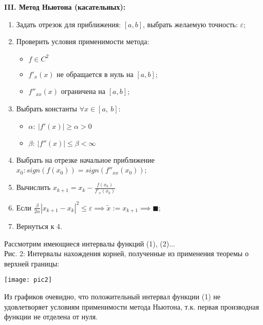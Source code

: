 {\large\bf{III. Метод  Ньютона (касательных):}}
\begin{enumerate}
    \item Задать отрезок для приближения: $[a, b]$, выбрать желаемую точность: $\varepsilon$;
    \item Проверить условия применимости метода:
        \begin{itemize}
            \item $f \in C^2$
            \item $f'_x(x)$ не обращается в нуль на $[a, b]$;
            \item $f''_{xx}(x)$ ограничена на $[a, b]$;
        \end{itemize}
    \item Выбрать константы $\forall x \in [a,~ b]$:
        \begin{itemize}
            \item $\alpha: ~ |f'(x)|\ge\alpha>0$
            \item $\beta: ~ |f''(x)|\le\beta<\infty$
        \end{itemize}
    \item Выбрать на отрезке начальное приближение $x_0: sign(f(x_0))=sign(f''_{xx}(x_0))$;
    \item Вычислить $x_{k+1}=x_k-\frac{f(x_k)}{f'_x(x_k)}$
    \item Если $\frac{\beta}{2\alpha}|x_{k+1}-x_k|^2\le\varepsilon
    \implies \widetilde{x}:=x_{k+1}\implies\blacksquare$;
    \item Вернуться к 4.
\end{enumerate}
Рассмотрим имеющиеся интервалы функций (1), (2)...\\
Рис. 2: Интервалы нахождения корней, полученные из применения теоремы о верхней границы:
\begin{center}
    \texttt{[image: pic2]}
\end{center}
Из графиков очевидно, что положительный интервал функции (1) не удовлетворяет условиям применимости метода Ньютона, т.к. первая производная функции не отделена от нуля.
\newpage

